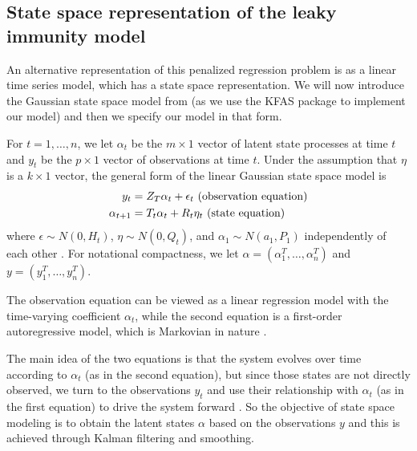 \documentclass{article}
\begin{document}
\subsection{State space representation of the leaky immunity model}

An alternative representation of this penalized regression problem is as a linear time series model, which has a state space representation. We will now introduce the Gaussian state space model from \citet{helske2017kfas} (as we use the KFAS package to implement our model) and then we specify our model in that form.

For $t = 1, \dots, n$, we let $\alpha_t$ be the $m \times 1$ vector of latent state processes at time $t$ and $y_t$ be the $p \times 1$ vector of observations at time $t$. Under the assumption that $\eta$ is a $k \times 1$ vector, the general form of the linear Gaussian state space model is 
\begin{align}
y_t &= Z_T\alpha_t + \epsilon_t  \text{     (observation equation)} \label{eq:ss1}\\
\alpha_{t+1} &= T_t\alpha_t + R_t\eta_t  \text{     (state equation) \label{eq:ss2}}
\end{align}
where $\epsilon \sim N(0, H_t)$, $\eta \sim N(0, Q_t)$, and $\alpha_1 \sim N(a_1, P_1)$ independently of each other \citep{helske2017kfas}. For notational compactness, we let $\alpha = \left ( \alpha_1^T, \dots, \alpha_n^T \right )$ and $y = \left ( y_1^T, \dots, y_n^T \right )$.

The observation equation can be viewed as a linear regression model with the time-varying coefficient $\alpha_t$, while the second equation is a first-order autoregressive model, which is Markovian in nature \citep{durbin2012time}. 

The main idea of the two equations is that the system evolves over time according to $\alpha_t$ (as in the second equation), but since those states are not directly observed, we turn to the observations $y_t$ and use their relationship with $\alpha_t$ (as in the first equation) to drive the system forward \citep{durbin2012time}. So the objective of state space modeling is to obtain the latent states $\alpha$ based on the observations $y$ and this is achieved through Kalman filtering and smoothing. 
\end{document}
